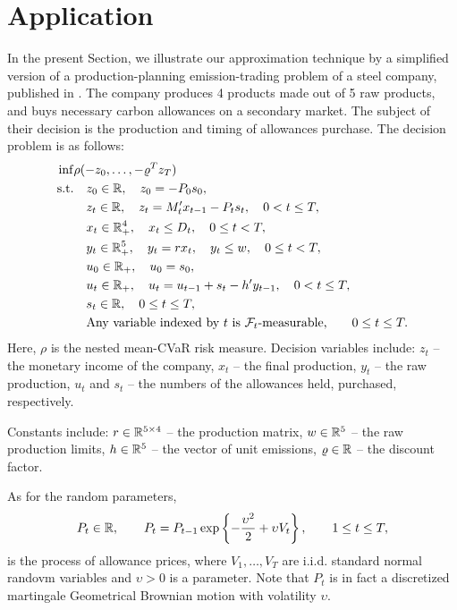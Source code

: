 \documentclass{article}              %
\begin{document}
\section{\label{sec:appl}Application}

In the present Section, we illustrate our approximation technique by
a simplified version of a production-planning emission-trading problem
of a steel company, published in \cite{zapletal2019multi}. The company produces
4 products made out of 5 raw products, and buys necessary carbon allowances
on a secondary market. The subject of their decision is the production
and timing of allowances purchase. The decision problem is as follows:
\begin{align}
\inf & \rho(-z_{0},\dots,-\varrho^{T}z_{T})\label{eq:etp}\\
\text{s.t.} &\quad z_{0}\in\mathbb{R},\quad z_{0}=-P_{0}s_{0},\nonumber \\
 &\quad z_{t}\in\mathbb{R},\quad z_{t}=M'_{t}x_{t-1}-P_{t}s_{t},\quad 0<t\leq T, \nonumber \\
 &\quad x_{t}\in\mathbb{R}_{+}^{4},\quad x_{t}\leq D_{t},\quad 0\leq t<T,\nonumber \\
 &\quad y_{t}\in\mathbb{R}_{+}^{5},\quad y_{t}=rx_{t},\quad y_{t}\leq w,\quad 0\leq t<T,\nonumber \\
 &\quad u_{0}\in\mathbb{R}_{+},\quad u_{0}=s_{0},\nonumber \\
 &\quad u_{t}\in\mathbb{R}_{+},\quad u_{t}=u_{t-1}+s_{t}-h'y_{t-1},\quad 0<t\leq T,\nonumber \\
 &\quad s_{t}\in\mathbb{R},\quad 0\leq t \leq T,\nonumber\\
 &\quad \text{Any variable indexed by $t$ is $\mathcal{F}_t$-measurable,}\qquad 0\leq t\leq T. \nonumber 
\end{align}
Here, $\rho$ is the nested mean-CVaR risk measure. Decision variables include: $z_t$ -- the monetary income of the company, $x_t$ -- the final production, $y_t$ -- the raw production, $u_t$ and $s_t$ -- the numbers of the allowances held, purchased, respectively.

Constants include: $r \in \mathbb{R}^{5 \times 4}$ -- the production matrix, $w\in \mathbb{R}^5$ -- the raw production limits, $h \in \mathbb{R}^5$ -- the vector of unit emissions, $\varrho \in \mathbb{R}$ -- the discount factor.

As for the random parameters,
$$
P_t \in \mathbb{R},\qquad P_t = P_{t-1}\exp\left\{ -\frac{\upsilon^2}2 + \upsilon V_t \right\},
\qquad 1\leq t \leq T,
$$ 
is the process of allowance prices, where $V_1,\dots,V_T$ are i.i.d. standard normal randovm variables and $\upsilon > 0$ is a parameter. Note that $P_t$ is in fact a discretized martingale Geometrical Brownian motion with volatility $\upsilon$.
\end{document}
